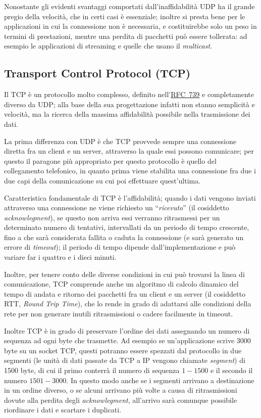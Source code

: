 Nonostante gli evidenti svantaggi comportati dall'inaffidabilità UDP ha il
grande pregio della velocità, che in certi casi è essenziale; inoltre si
presta bene per le applicazioni in cui la connessione non è necessaria, e
costituirebbe solo un peso in termini di prestazioni, mentre una perdita di
pacchetti può essere tollerata: ad esempio le applicazioni di streaming e
quelle che usano il \textit{multicast}.

\subsection{Transport Control Protocol (TCP)}
\label{sec:net_tcp}

Il TCP è un protocollo molto complesso, definito
nell'\href{http://www.ietf.org/rfc/rfc0739.txt}{RFC~739} e completamente
diverso da UDP; alla base della sua progettazione infatti non stanno
semplicità e velocità, ma la ricerca della massima affidabilità possibile
nella trasmissione dei dati.

La prima differenza con UDP è che TCP provvede sempre una connessione diretta
fra un client e un server, attraverso la quale essi possono comunicare; per
questo il paragone più appropriato per questo protocollo è quello del
collegamento telefonico, in quanto prima viene stabilita una connessione fra
due i due capi della comunicazione su cui poi effettuare quest'ultima.

Caratteristica fondamentale di TCP è l'affidabilità; quando i dati vengono
inviati attraverso una connessione ne viene richiesto un ``\textsl{ricevuto}''
(il cosiddetto \textit{acknowlegment}), se questo non arriva essi verranno
ritrasmessi per un determinato numero di tentativi, intervallati da un periodo
di tempo crescente, fino a che sarà considerata fallita o caduta la
connessione (e sarà generato un errore di \textit{timeout}); il periodo di
tempo dipende dall'implementazione e può variare far i quattro e i dieci
minuti.

Inoltre, per tenere conto delle diverse condizioni in cui può trovarsi la
linea di comunicazione, TCP comprende anche un algoritmo di calcolo dinamico
del tempo di andata e ritorno dei pacchetti fra un client e un server (il
cosiddetto RTT, \textit{Round Trip Time}), che lo rende in grado di adattarsi
alle condizioni della rete per non generare inutili ritrasmissioni o cadere
facilmente in timeout.

Inoltre TCP è in grado di preservare l'ordine dei dati assegnando un numero di
sequenza ad ogni byte che trasmette. Ad esempio se un'applicazione scrive 3000
byte su un socket TCP, questi potranno essere spezzati dal protocollo in due
segmenti (le unità di dati passate da TCP a IP vengono chiamate
\textit{segment}) di 1500 byte, di cui il primo conterrà il numero di sequenza
$1-1500$ e il secondo il numero $1501-3000$. In questo modo anche se i
segmenti arrivano a destinazione in un ordine diverso, o se alcuni arrivano
più volte a causa di ritrasmissioni dovute alla perdita degli
\textit{acknowlegment}, all'arrivo sarà comunque possibile riordinare i dati e
scartare i duplicati.

